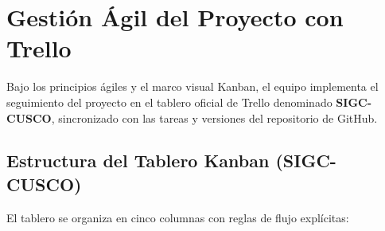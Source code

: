 
\section{Gestión Ágil del Proyecto con Trello}

Bajo los principios ágiles y el marco visual Kanban, el equipo implementa el seguimiento del proyecto en el tablero oficial de Trello denominado \textbf{SIGC-CUSCO}, sincronizado con las tareas y versiones del repositorio de GitHub.

\subsection{Estructura del Tablero Kanban (SIGC-CUSCO)}

El tablero se organiza en cinco columnas con reglas de flujo explícitas:

